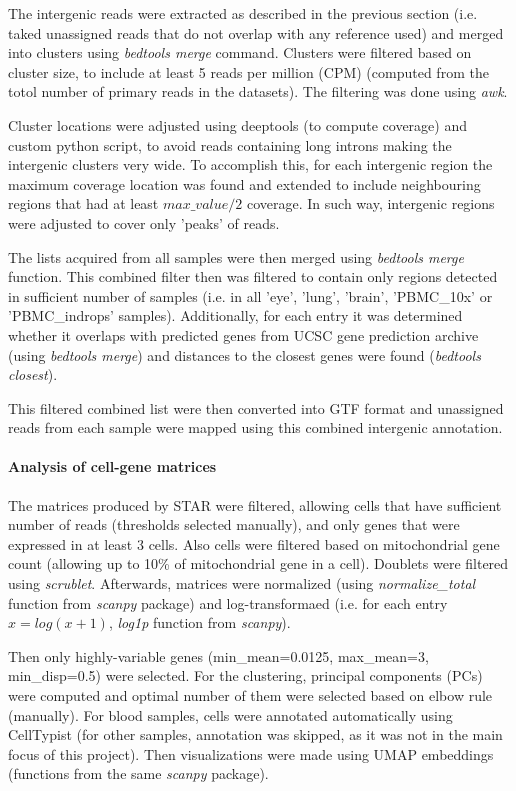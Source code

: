 The intergenic reads were extracted as described in the previous section (i.e. taked unassigned reads that do not overlap with any reference used)
and merged into clusters using \textit{bedtools merge} command.
Clusters were filtered based on cluster size, to include at least 5 reads per million (CPM)
(computed from the totol number of primary reads in the datasets).
The filtering was done using \textit{awk}.

Cluster locations were adjusted using deeptools (to compute coverage) and custom python script,
to avoid reads containing long introns making the intergenic clusters very wide.
To accomplish this, for each intergenic region the maximum coverage location was found and extended to include neighbouring regions that had
at least $max\_value / 2$ coverage.
In such way, intergenic regions were adjusted to cover only 'peaks' of reads.

The lists acquired from all samples were then merged using \textit{bedtools merge} function.
This combined filter then was filtered to contain only regions detected in sufficient number of samples
(i.e. in all 'eye', 'lung', 'brain', 'PBMC\_10x' or 'PBMC\_indrops' samples).
Additionally, for each entry it was determined whether it overlaps with predicted genes from UCSC gene prediction archive
(using \textit{bedtools merge}) and distances to the closest genes were found (\textit{bedtools closest}).

This filtered combined list were then converted into GTF format and unassigned reads from each sample were mapped using this
combined intergenic annotation.

\paragraph{Analysis of cell-gene matrices}

The matrices produced by STAR were filtered, allowing cells that have sufficient number of reads (thresholds selected manually),
and only genes that were expressed in at least 3 cells.
Also cells were filtered based on mitochondrial gene count (allowing up to 10\% of mitochondrial gene in a cell).
Doublets were filtered using \textit{scrublet}.
Afterwards, matrices were normalized (using \textit{normalize\_total} function from \textit{scanpy} package) and log-transformaed
(i.e. for each entry $x = log(x+1)$, \textit{log1p} function from \textit{scanpy}).

Then only highly-variable genes (min\_mean=0.0125, max\_mean=3, min\_disp=0.5) were selected.
For the clustering, principal components (PCs) were computed and optimal number of them were selected based on elbow rule (manually).
For blood samples, cells were annotated automatically using CellTypist
(for other samples, annotation was skipped, as it was not in the main focus of this project).
Then visualizations were made using UMAP embeddings (functions from the same \textit{scanpy} package).

